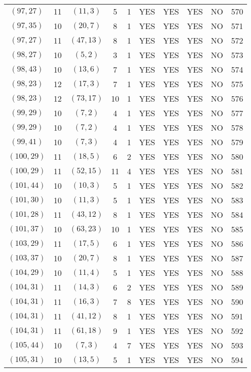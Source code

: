 \begin{longtable}{|c|c|c|c|c|c|c|c|c|c|}
$(97, 27)$ & 11 & $(11, 3)$ & 5 & 1 & YES & YES & YES & NO & 570\\
$(97, 35)$ & 10 & $(20, 7)$ & 8 & 1 & YES & YES & YES & NO & 571\\
$(97, 27)$ & 11 & $(47, 13)$ & 8 & 1 & YES & YES & YES & NO & 572\\
$(98, 27)$ & 10 & $(5, 2)$ & 3 & 1 & YES & YES & YES & NO & 573\\
$(98, 43)$ & 10 & $(13, 6)$ & 7 & 1 & YES & YES & YES & NO & 574\\
$(98, 23)$ & 12 & $(17, 3)$ & 7 & 1 & YES & YES & YES & NO & 575\\
$(98, 23)$ & 12 & $(73, 17)$ & 10 & 1 & YES & YES & YES & NO & 576\\
$(99, 29)$ & 10 & $(7, 2)$ & 4 & 1 & YES & YES & YES & NO & 577\\
$(99, 29)$ & 10 & $(7, 2)$ & 4 & 1 & YES & YES & YES & NO & 578\\
$(99, 41)$ & 10 & $(7, 3)$ & 4 & 1 & YES & YES & YES & NO & 579\\
$(100, 29)$ & 11 & $(18, 5)$ & 6 & 2 & YES & YES & YES & NO & 580\\
$(100, 29)$ & 11 & $(52, 15)$ & 11 & 4 & YES & YES & YES & NO & 581\\
$(101, 44)$ & 10 & $(10, 3)$ & 5 & 1 & YES & YES & YES & NO & 582\\
$(101, 30)$ & 10 & $(11, 3)$ & 5 & 1 & YES & YES & YES & NO & 583\\
$(101, 28)$ & 11 & $(43, 12)$ & 8 & 1 & YES & YES & YES & NO & 584\\
$(101, 37)$ & 10 & $(63, 23)$ & 10 & 1 & YES & YES & YES & NO & 585\\
$(103, 29)$ & 11 & $(17, 5)$ & 6 & 1 & YES & YES & YES & NO & 586\\
$(103, 37)$ & 10 & $(20, 7)$ & 8 & 1 & YES & YES & YES & NO & 587\\
$(104, 29)$ & 10 & $(11, 4)$ & 5 & 1 & YES & YES & YES & NO & 588\\
$(104, 31)$ & 11 & $(14, 3)$ & 6 & 2 & YES & YES & YES & NO & 589\\
$(104, 31)$ & 11 & $(16, 3)$ & 7 & 8 & YES & YES & YES & NO & 590\\
$(104, 31)$ & 11 & $(41, 12)$ & 8 & 1 & YES & YES & YES & NO & 591\\
$(104, 31)$ & 11 & $(61, 18)$ & 9 & 1 & YES & YES & YES & NO & 592\\
$(105, 44)$ & 10 & $(7, 3)$ & 4 & 7 & YES & YES & YES & NO & 593\\
$(105, 31)$ & 10 & $(13, 5)$ & 5 & 1 & YES & YES & YES & NO & 594\\

\end{longtable}
